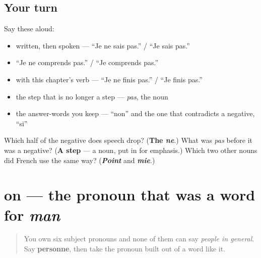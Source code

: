 \subsection*{Your turn}
Say these aloud:

\begin{itemize}
\raggedright
  \item written, then spoken — \textquotedblleft{}Je ne sais pas.\textquotedblright{} / \textquotedblleft{}Je sais pas.\textquotedblright{}
  \item \textquotedblleft{}Je ne comprends pas.\textquotedblright{} / \textquotedblleft{}Je comprends pas.\textquotedblright{}
  \item with this chapter's verb — \textquotedblleft{}Je ne finis pas.\textquotedblright{} / \textquotedblleft{}Je finis pas.\textquotedblright{}
  \item the step that is no longer a step — \emph{pas}, the noun
  \item the answer-words you keep — \textquotedblleft{}non\textquotedblright{} and the one that contradicts a negative, \textquotedblleft{}si\textquotedblright{}
\end{itemize}

\begin{tcolorbox}[breakable,colback=teal!4,colframe=teal!35!black,title={Before you move on}]
Which half of the negative does speech drop? (\textbf{The \emph{ne}}.) What was \emph{pas} before it was a negative? (\textbf{A step} — a noun, put in for emphasis.) Which two other nouns did French use the same way? (\emph{\textbf{Point}} and \emph{\textbf{mie}}.)
\end{tcolorbox}
\section[on]{on — the pronoun that was a word for \emph{man}}

\label{lesson:FR-C37-on}



\begin{quote}
You own six subject pronouns and none of them can say \emph{people in general}. Say \textbf{personne}, then take the pronoun built out of a word like it.
\end{quote}

